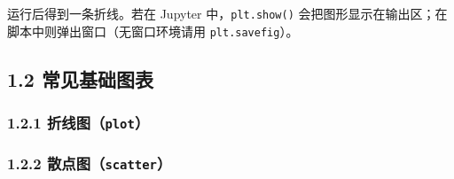 运行后得到一条折线。若在 Jupyter 中，\texttt{plt.show()}
会把图形显示在输出区；在脚本中则弹出窗口（无窗口环境请用
\texttt{plt.savefig}）。

\subsection{1.2
常见基础图表}\label{ux5e38ux89c1ux57faux7840ux56feux8868}

\subsubsection{\texorpdfstring{1.2.1
折线图（\texttt{plot}）}{1.2.1 折线图（plot）}}\label{ux6298ux7ebfux56feplot}

\begin{Shaded}
\begin{Highlighting}[]

\OperatorTok{=}\NormalTok{ [}\NormalTok{, }\NormalTok{, }\NormalTok{, }\NormalTok{, }\NormalTok{]}
\OperatorTok{=}\NormalTok{ [}\NormalTok{, }\NormalTok{, }\NormalTok{, }\NormalTok{, }\NormalTok{]}
\NormalTok{)}
\NormalTok{)}
\NormalTok{)}
\NormalTok{(}
\NormalTok{(}
\end{Highlighting}
\end{Shaded}

\begin{Shaded}
\begin{Highlighting}[]
\end{Highlighting}
\end{Shaded}

\subsubsection{\texorpdfstring{1.2.2
散点图（\texttt{scatter}）}{1.2.2 散点图（scatter）}}\label{ux6563ux70b9ux56fescatter}

